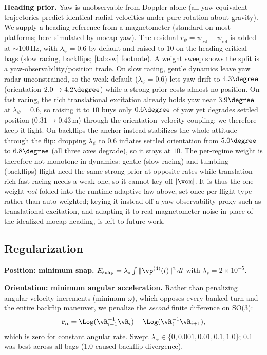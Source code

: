 \textbf{Heading prior.}
Yaw is unobservable from Doppler alone (all yaw-equivalent
trajectories predict identical radial velocities under pure
rotation about gravity).  We supply a heading reference from a magnetometer (standard on
most platforms; here simulated by \ac{mocap} yaw).  The residual $r_\psi = \psi_\text{est} - \psi_\text{ref}$
is added at $\sim$100\,Hz, with $\lambda_\psi = 0.6$ by default and
raised to $10$ on the heading-critical bags (slow racing, backflips;
\autoref{tab:sw} footnote).
A weight sweep shows the split is a yaw-observability/position trade.
On slow racing, gentle dynamics leave yaw radar-unconstrained, so the
weak default ($\lambda_\psi{=}0.6$) lets yaw drift to $4.3\degree$
(orientation $2.0\to4.2\degree$) while a strong prior costs almost no
position.  On fast racing, the rich translational excitation already
holds yaw near $3.9\degree$ at $\lambda_\psi{=}0.6$, so raising it to
$10$ buys only $0.6\degree$ of yaw yet degrades settled position
($0.31\to0.43$\,m) through the orientation--velocity coupling; we
therefore keep it light.  On backflips the anchor instead stabilizes the
whole attitude through the flip: dropping $\lambda_\psi$ to $0.6$ inflates
settled orientation from $5.0\degree$ to $6.8\degree$ (all three axes
degrade), so it stays at $10$.  The per-regime weight is therefore not
monotone in dynamics: gentle (slow racing) and tumbling (backflips) flight
need the same strong prior at opposite rates while translation-rich fast
racing needs a weak one, so it cannot key off $|\vom|$.  It is thus the one
weight \emph{not} folded into the runtime-adaptive law above, set once per
flight type rather than auto-weighted; keying it instead off a
yaw-observability proxy such as translational excitation, and adapting it to
real magnetometer noise in place of the idealized \ac{mocap} heading, is
left to future work.

\subsection{Regularization}
\label{sec:reg}

\textbf{Position: minimum snap.}
$E_{\text{snap}} = \lambda_s \int \|\vp^{(4)}(t)\|^2\,dt$
with $\lambda_s = 2{\times}10^{-5}$.

\textbf{Orientation: minimum angular acceleration.}
Rather than penalizing angular velocity increments (minimum $\omega$),
which opposes every banked turn and the entire backflip maneuver, we
penalize the \emph{second} finite difference on SO(3):
\begin{equation}
  \mathbf{r}_\alpha = \Log(\vR_{i-1}^{-1}\vR_i)
                    - \Log(\vR_i^{-1}\vR_{i+1}),
  \label{eq:min_alpha}
\end{equation}
which is zero for constant angular rate.
Swept $\lambda_\alpha \in \{0, 0.001, 0.01, 0.1, 1.0\}$; 0.1
was best across all bags (1.0 caused backflip divergence).

